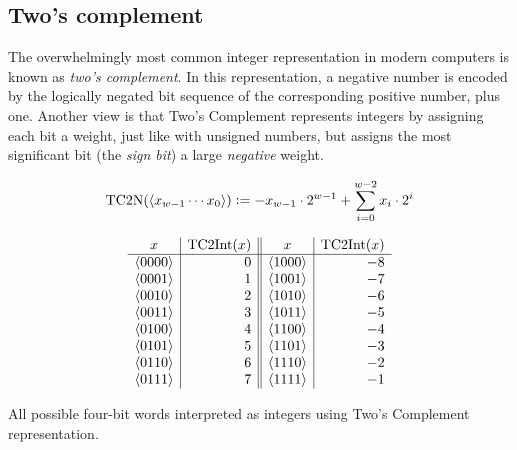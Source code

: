 \subsection{Two's complement}
\label{sec:twos-complement}

The overwhelmingly most common integer representation in modern
computers is known as \emph{two's complement}.  In this
representation, a negative number is encoded by the logically negated
bit sequence of the corresponding positive number, plus one.  Another
view is that Two's Complement represents integers by assigning each
bit a weight, just like with unsigned numbers, but assigns the most
significant bit (the \emph{sign bit}) a large \emph{negative} weight.

\begin{definition}
\begin{align*}
  \mathrm{TC2N}(\langle x_{w-1}\cdots x_{0} \rangle) \vcentcolon= -x_{w-1}\cdot 2^{w-1} + \sum_{i=0}^{w-2} x_{i} \cdot{} 2^{i}
\end{align*}
\label{def:tc2n}
\end{definition}

\begin{table}
  \centering
  \[
  \begin{array}{c|r||c|r}
    x & \mathrm{TC2Int}(x) & x & \mathrm{TC2Int}(x) \\\hline
    \langle 0000 \rangle & 0 & \langle 1000 \rangle & -8 \\
    \langle 0001 \rangle & 1 & \langle 1001 \rangle & -7 \\
    \langle 0010 \rangle & 2 & \langle 1010 \rangle & -6 \\
    \langle 0011 \rangle & 3 & \langle 1011 \rangle & -5 \\
    \langle 0100 \rangle & 4 & \langle 1100 \rangle & -4 \\
    \langle 0101 \rangle & 5 & \langle 1101 \rangle & -3 \\
    \langle 0110 \rangle & 6 & \langle 1110 \rangle & -2 \\
    \langle 0111 \rangle & 7 & \langle 1111 \rangle & -1 \\
  \end{array}
  \]
  \caption{All possible four-bit words interpreted as integers using
    Two's Complement representation.}
  \label{tab:twos-complement}
\end{table}

